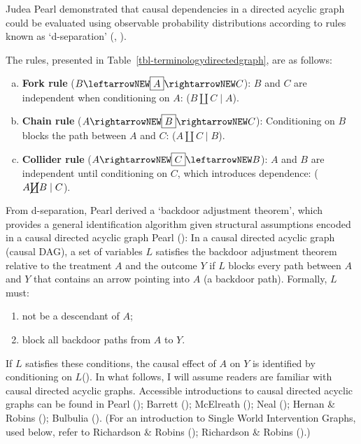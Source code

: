 \documentclass[
  single column]{article}
\providecommand{\tightlist}{%
  \setlength{\itemsep}{0pt}\setlength{\parskip}{0pt}}\usepackage{longtable,booktabs,array}
\begin{document}
Judea Pearl demonstrated that causal dependencies in a directed acyclic
graph could be evaluated using observable probability distributions
according to rules known as `d-separation'
(,
).

The rules, presented in Table~\ref{tbl-terminologydirectedgraph}, are as
follows:

\begin{enumerate}[a)]
     \item  {\bf Fork rule} ($B \leftarrowNEW \boxed{A} \rightarrowNEW C$): $B$ and $C$ are independent when conditioning on $A$: ($B \coprod C \mid A$).
     \item  {\bf Chain rule} ($A \rightarrowNEW \boxed{B} \rightarrowNEW C$): Conditioning on $B$ blocks the path between $A$ and $C$: ($A \coprod C \mid B$).
     \item  {\bf Collider rule} ($A \rightarrowNEW \boxed{C} \leftarrowNEW B$): $A$ and $B$ are independent until conditioning on $C$, which introduces dependence: ($A \cancel{\coprod} B \mid C$). 
 \end{enumerate}

From d-separation, Pearl derived a `backdoor adjustment theorem', which
provides a general identification algorithm given structural assumptions
encoded in a causal directed acyclic graph Pearl
(): In a causal directed acyclic graph
(causal DAG), a set of variables \(L\) satisfies the backdoor adjustment
theorem relative to the treatment \(A\) and the outcome \(Y\) if \(L\)
blocks every path between \(A\) and \(Y\) that contains an arrow
pointing into \(A\) (a backdoor path). Formally, \(L\) must:

\begin{enumerate}
\def\labelenumi{\arabic{enumi}.}
\tightlist
\item
  not be a descendant of \(A\);
\item
  block all backdoor paths from \(A\) to \(Y\).
\end{enumerate}

If \(L\) satisfies these conditions, the causal effect of \(A\) on \(Y\)
is identified by conditioning on
\(\boxed{L}\)(). In what follows,
I will assume readers are familiar with causal directed acyclic graphs.
Accessible introductions to causal directed acyclic graphs can be found
in Pearl (); Barrett
(); McElreath
(); Neal
(); Hernan \& Robins
(); Bulbulia
(). (For an introduction to Single
World Intervention Graphs, used below, refer to Richardson \& Robins
(); Richardson \& Robins
().)
\end{document}
